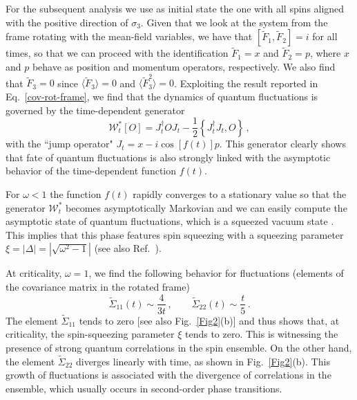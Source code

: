 \documentclass[prl,superscriptaddress,showpacs,longbibliography,reprint]{revtex4-2}
\begin{document}
For the subsequent analysis we use as initial state the one with all spins aligned with the positive direction of $\sigma_3$. Given that we look at the system from the frame rotating with the mean-field variables, we have that $[\tilde{F}_1,\tilde{F}_2]=i$ for all times, so that we can proceed with the identification $\tilde{F}_1=x$ and $\tilde{F}_2=p$, where $x$ and $p$ behave as position and momentum operators, respectively. We also find that $\tilde{F}_3=0$ since $\langle \tilde{F}_3\rangle =0$ and $\langle \tilde{F}_3^2\rangle=0$. Exploiting the result reported in Eq.~\eqref{cov-rot-frame}, we find that the dynamics of quantum fluctuations is governed by the time-dependent generator 
\begin{equation}
\mathcal{W}^*_t[O]= J_t^\dagger O J_t-\frac{1}{2}\left\{J^\dagger_t J_t,O\right\}\, ,
    \label{fluc-dyn-BTC}
\end{equation}
with the ``jump operator" $J_t=x-i\cos[f(t)] p$. This generator clearly shows that fate of quantum fluctuations is also strongly linked with the asymptotic behavior of the time-dependent function $f(t)$. 

For $\omega<1$ the function $f(t)$ rapidly converges to a stationary value so that the generator $\mathcal{W}^*_t$ becomes asymptotically Markovian and we can easily compute the asymptotic state of quantum fluctuations, which is a squeezed vacuum state \cite{SM}. This implies that this phase features spin squeezing \cite{kitagawa1993,ma2011,gross2012} with a squeezing parameter $\xi=|\Delta|=|\sqrt{\omega^2-1}|$ (see also Ref.~\cite{buonaiuto2021}). 

At criticality, $\omega=1$, we find the following behavior for fluctuations (elements of the covariance matrix in the rotated frame)  
\begin{equation}
\tilde{\Sigma}_{11}(t)\sim \frac{4}{3t} \, ,\qquad \tilde{\Sigma}_{22}(t)\sim \frac{ t}{5}\,.
\label{fluc-crit}
\end{equation}
The element  $\tilde{\Sigma}_{11}$ tends to zero [see also Fig.~\ref{Fig2}(b)] and thus shows that, at criticality, the spin-squeezing parameter $\xi$ tends to zero. This is witnessing the presence of strong quantum correlations in the spin ensemble. On the other hand, the element $\tilde{\Sigma}_{22}$ diverges linearly with time, as shown in Fig.~\ref{Fig2}(b). This growth of fluctuations is associated with the divergence of correlations in the ensemble, which usually occurs in second-order phase transitions. 
\end{document}
